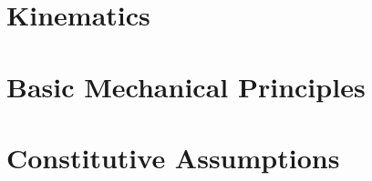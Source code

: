 \documentclass[11pt,fleqn]{book} %
\begin{document}
%

\vspace*{\fill}




\pagestyle{empty} %

\tableofcontents %

\cleardoublepage %

\pagestyle{fancy} %


\part{Kinematics}


\part{Basic Mechanical Principles}


\part{Constitutive Assumptions}

%
%
\end{document}
